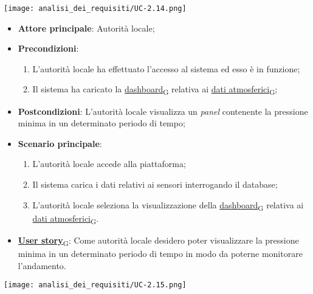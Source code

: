\begin{center}
	\texttt{[image: analisi\_dei\_requisiti/UC-2.14.png]}
\end{center}
\begin{itemize}
	\item \textbf{Attore principale}: Autorità locale;
	\item \textbf{Precondizioni}:
	      \begin{enumerate}
		      \item L'autorità locale ha effettuato l'accesso al sistema ed esso è in funzione;
		      \item Il sistema ha caricato la \href{https://7last.github.io/docs/rtb/documentazione-interna/glossario\#dashboard}{dashboard\textsubscript{G}} relativa ai \href{https://7last.github.io/docs/rtb/documentazione-interna/glossario\#dati-atmosferici}{dati atmosferici\textsubscript{G}};
	      \end{enumerate}
	\item \textbf{Postcondizioni}: L'autorità locale visualizza un \textit{panel} contenente la pressione minima in un determinato periodo di tempo;
	\item \textbf{Scenario principale}:
	      \begin{enumerate}
		      \item L'autorità locale accede alla piattaforma;
		      \item Il sistema carica i dati relativi ai sensori interrogando il database;
		      \item L'autorità locale seleziona la visualizzazione della \href{https://7last.github.io/docs/rtb/documentazione-interna/glossario\#dashboard}{dashboard\textsubscript{G}} relativa ai \href{https://7last.github.io/docs/rtb/documentazione-interna/glossario\#dati-atmosferici}{dati atmosferici\textsubscript{G}}.
	      \end{enumerate}
	\item \href{https://7last.github.io/docs/rtb/documentazione-interna/glossario\#user-story}{\textbf{User story}\textsubscript{G}}: Come autorità locale desidero poter visualizzare la pressione minima in un determinato periodo di tempo
	      in modo da poterne monitorare l'andamento.
\end{itemize}

\begin{center}
	\texttt{[image: analisi\_dei\_requisiti/UC-2.15.png]}
\end{center}

